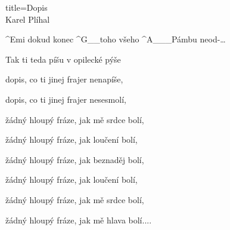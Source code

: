 \begin{song}{title=\predtitle\centering Dopis \\\large Karel Plíhal  \vspace*{-0.7cm}}
\begin{centerjustified}
	^{Emi\,\,}dokud konec ^{G{\color{white}\_\_}}toho všeho ^{A{\color{white}\_\_\_}}Pámbu neod-\elipsa\ldots

	Tak ti teda píšu v opilecké pýše

	dopis, co ti jinej frajer nenapíše,

	dopis, co ti jinej frajer nesesmolí,

	žádný hloupý fráze, jak mě srdce bolí,

	žádný hloupý fráze, jak loučení bolí,

	žádný hloupý fráze, jak beznaděj bolí,

	žádný hloupý fráze, jak loučení bolí,

	žádný hloupý fráze, jak mě srdce bolí,

	žádný hloupý fráze, jak mě hlava bolí.\elipsa.\elipsa.\elipsa.
   


\end{centerjustified}
\setcounter{Slokočet}{0}
\end{song}
